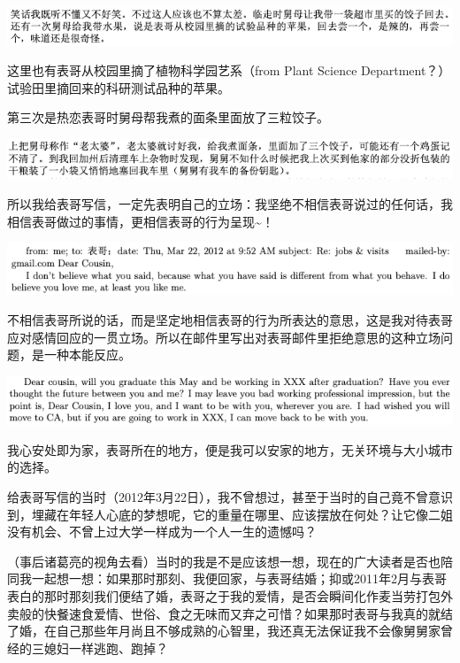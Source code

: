 \documentclass[9pt, b5paper]{article}
\begin{document}
\begin{center}
\includegraphics[width=.9\linewidth]{./pic/p1p39-1.png}
\end{center}

这里也有表哥从校园里摘了植物科学园艺系（from Plant Science Department？）试验田里摘回来的科研测试品种的苹果。

第三次是热恋表哥时舅母帮我煮的面条里面放了三粒饺子。 

\begin{center}
\includegraphics[width=.9\linewidth]{./pic/p1p51-1.png}
\end{center}

所以我给表哥写信，一定先表明自己的立场：我坚绝不相信表哥说过的任何话，我相信表哥做过的事情，更相信表哥的行为呈现\textasciitilde{}！

\begin{center}
\includegraphics[width=.9\linewidth]{./pic/p1p116-2.png}
\end{center}

不相信表哥所说的话，而是坚定地相信表哥的行为所表达的意思，这是我对待表哥应对感情回应的一贯立场。所以在邮件里写出对表哥邮件里拒绝意思的这种立场问题，是一种本能反应。

\begin{center}
\includegraphics[width=.9\linewidth]{./pic/p1p116-3.png}
\end{center}

我心安处即为家，表哥所在的地方，便是我可以安家的地方，无关环境与大小城市的选择。

给表哥写信的当时（2012年3月22日），我不曾想过，甚至于当时的自己竟不曾意识到，埋藏在年轻人心底的梦想呢，它的重量在哪里、应该摆放在何处？让它像二姐没有机会、不曾上过大学一样成为一个人一生的遗憾吗？

（事后诸葛亮的视角去看）当时的我是不是应该想一想，现在的广大读者是否也陪同我一起想一想：如果那时那刻、我便回家，与表哥结婚；抑或2011年2月与表哥表白的那时那刻我们便结了婚，表哥之于我的爱情，是否会瞬间化作麦当劳打包外卖般的快餐速食爱情、世俗、食之无味而又弃之可惜？如果那时表哥与我真的就结了婚，在自己那些年月尚且不够成熟的心智里，我还真无法保证我不会像舅舅家曾经的三媳妇一样逃跑、跑掉？
\end{document}
